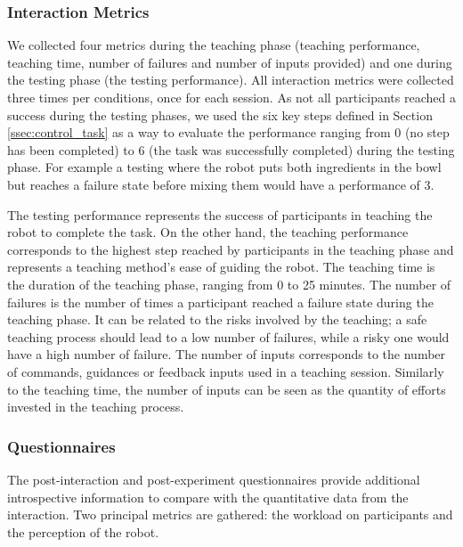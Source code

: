 \subsubsection{Interaction Metrics}

We collected four metrics during the teaching phase (teaching performance, teaching time, number of failures and number of inputs provided) and one during the testing phase (the testing performance). All interaction metrics were collected three times per conditions, once for each session. As not all participants reached a success during the testing phases, we used the six key steps defined in Section \ref{ssec:control_task} as a way to evaluate the performance ranging from 0 (no step has been completed) to 6 (the task was successfully completed) during the testing phase. For example a testing where the robot puts both ingredients in the bowl but reaches a failure state before mixing them would have a performance of 3. 

The testing performance represents the success of participants in teaching the robot to complete the task. On the other hand, the teaching performance corresponds to the highest step reached by participants in the teaching phase and represents a teaching method's ease of guiding the robot. The teaching time is the duration of the teaching phase, ranging from 0 to 25 minutes. The number of failures is the number of times a participant reached a failure state during the teaching phase. It can be related to the risks involved by the teaching; a safe teaching process should lead to a low number of failures, while a risky one would have a high number of failure. The number of inputs corresponds to the number of commands, guidances or feedback inputs used in a teaching session. Similarly to the teaching time, the number of inputs can be seen as the quantity of efforts invested in the teaching process.

\subsubsection{Questionnaires} \label{ssec:control_questionnaires}

The post-interaction and post-experiment questionnaires provide additional introspective information to compare with the quantitative data from the interaction. Two principal metrics are gathered: the workload on participants and the perception of the robot. 

